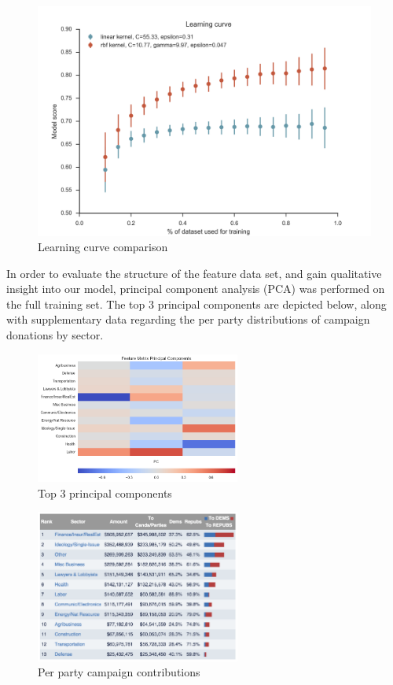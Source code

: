 \documentclass[12]{article}
\begin{document}
\begin{figure}[H]
\begin{center}
\includegraphics[width=0.6\linewidth]{learning_curve.png}
\caption{Learning curve comparison}
\end{center}
\end{figure}

\noindent In order to evaluate the structure of the feature data set, and gain qualitative 
insight into our model, principal component analysis (PCA) was performed on the 
full training set. The top 3 principal components are depicted below, along with 
supplementary data regarding the per party distributions of campaign donations 
by sector.

\begin{figure}[H]
\centering
    \includegraphics[width=0.6\textwidth]{cand_2010_2012_2014_fm_trim_normed_pc_hm.png}
    \caption{\label{fig:top_pc}Top 3 principal components}
\end{figure}

\begin{figure}[H]
\centering
    \includegraphics[width=0.6\textwidth]{totals_by_sector.png}
    \caption{\label{fig:party_total}Per party campaign contributions \cite{open_secrets}}
\end{figure}
\end{document}
